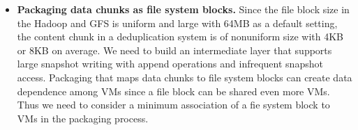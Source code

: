 \begin{itemize}
\item{\bf Packaging  data chunks as file system blocks.}
Since the file block size in the Hadoop and GFS is uniform and large with 64MB as a default setting,
the content chunk in a deduplication system is of nonuniform size with 4KB or 8KB on average.
We need to build an intermediate layer that supports large snapshot writing with append operations
and infrequent snapshot access.
Packaging that maps data chunks to file system blocks can create data dependence among VMs
since a file block can be shared even more VMs.
Thus we need to consider a minimum association of a fie system block to VMs in the packaging process.
\end{itemize}

